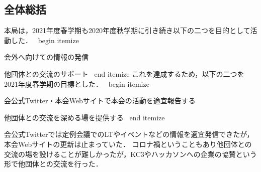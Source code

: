 \subsection*{全体総括}


本局は，2021年度春学期も2020年度秋学期に引き続き以下の二つを目的として活動した．
\ begin { itemize }
	\item 会外へ向けての情報の発信
	\item 他団体との交流のサポート
\ end { itemize }
これを達成するため，以下の二つを2021年度春学期の目標とした．
\ begin { itemize }
	\item 会公式Twitter・本会Webサイトで本会の活動を適宜報告する
	\item 他団体との交流を深める場を提供する
\ end { itemize }

会公式Twitterでは定例会議でのLTやイベントなどの情報を適宜発信できたが，本会Webサイトの更新は止まっていた．
コロナ禍ということもあり他団体との交流の場を設けることが難しかったが，KC3やハッカソンへの企業の協賛という形で他団体との交流を行った．
